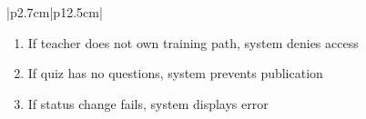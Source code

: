 \begin{table}[H]
\begin{tabular}{|p{2.7cm}|p{12.5cm}|}
\begin{minipage}[t]{\linewidth}
                                      \begin{enumerate}[topsep=0pt,itemsep=1pt,parsep=0pt,partopsep=0pt]
                                          \item If teacher does not own training path, system denies access
                                          \item If quiz has no questions, system prevents publication
                                          \item If status change fails, system displays error
                                      \end{enumerate}
                                  \end{minipage} \\
        \hline
    \end{tabular}
    \label{tab:teacher-publish-quiz}
\end{table}
